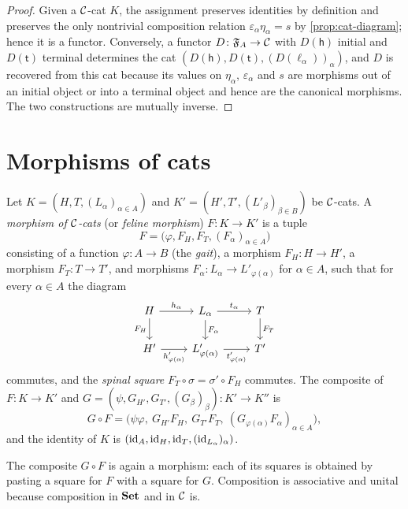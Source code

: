 \begin{proof}
Given a $\mathcal{C}$-cat $K$, the assignment preserves identities by definition and
preserves the only nontrivial composition relation $\varepsilon_\alpha\eta_\alpha=s$
by \cref{prop:cat-diagram}; hence it is a functor. Conversely, a functor
$D\colon\mathfrak{F}_A\to\mathcal{C}$ with $D(\mathsf h)$ initial and $D(\mathsf t)$ terminal
determines the cat $(D(\mathsf h),D(\mathsf t),(D(\ell_\alpha))_\alpha)$, and
$D$ is recovered from this cat because its values on $\eta_\alpha$,
$\varepsilon_\alpha$ and $s$ are morphisms out of an initial object or into a
terminal object and hence are the canonical morphisms. The two constructions
are mutually inverse.
\end{proof}

\section{Morphisms of cats}\label{sec:morphisms}

\begin{definition}\label{def:morphism}
Let $K=(H,T,(L_\alpha)_{\alpha\in A})$ and $K'=(H',T',(L'_\beta)_{\beta\in B})$
be $\mathcal{C}$-cats. A \emph{morphism of $\mathcal{C}$-cats} (or \emph{feline morphism})
$F\colon K\to K'$ is a tuple
\[
F=\bigl(\varphi,F_H,F_T,(F_\alpha)_{\alpha\in A}\bigr)
\]
consisting of a function $\varphi\colon A\to B$ (the \emph{gait}), a morphism
$F_H\colon H\to H'$, a morphism $F_T\colon T\to T'$, and morphisms
$F_\alpha\colon L_\alpha\to L'_{\varphi(\alpha)}$ for $\alpha\in A$, such that
for every $\alpha\in A$ the diagram
\begin{equation}\label{eq:morphism-diagram}
\begin{tikzcd}
  H \arrow[r, "h_\alpha"] \arrow[d, "F_H"'] & L_\alpha \arrow[r, "t_\alpha"] \arrow[d, "F_\alpha"] & T \arrow[d, "F_T"] \\
  H' \arrow[r, "h'_{\varphi(\alpha)}"'] & L'_{\varphi(\alpha)} \arrow[r, "t'_{\varphi(\alpha)}"'] & T'
\end{tikzcd}
\end{equation}
commutes, and the \emph{spinal square} $F_T\circ\sigma=\sigma'\circ F_H$
commutes. The composite of $F\colon K\to K'$ and
$G=(\psi,G_{H'},G_{T'},(G_\beta)_\beta)\colon K'\to K''$ is
\[
G\circ F=\bigl(\psi\varphi,\ G_{H'}F_H,\ G_{T'}F_T,\ (G_{\varphi(\alpha)}F_\alpha)_{\alpha\in A}\bigr),
\]
and the identity of $K$ is $(\mathrm{id}_A,\mathrm{id}_H,\mathrm{id}_T,(\mathrm{id}_{L_\alpha})_\alpha)$.
\end{definition}

The composite $G\circ F$ is again a morphism: each of its squares is obtained
by pasting a square for $F$ with a square for $G$. Composition is associative
and unital because composition in $\mathbf{Set}$ and in $\mathcal{C}$ is.

